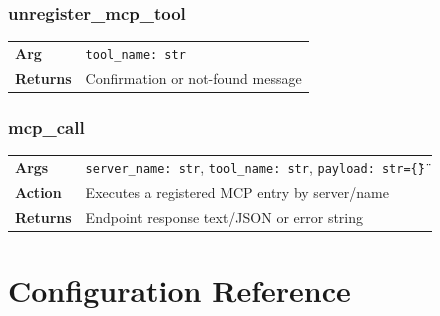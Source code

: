 \documentclass[11pt,a4paper]{article}
\begin{document}
\subsubsection{unregister\_mcp\_tool}

\begin{tabular}{@{}lp{10cm}@{}}
\textbf{Arg} & \texttt{tool\_name: str} \\
\textbf{Returns} & Confirmation or not-found message \\
\end{tabular}

\subsubsection{mcp\_call}

\begin{tabular}{@{}lp{10cm}@{}}
\textbf{Args} & \texttt{server\_name: str}, \texttt{tool\_name: str}, \texttt{payload: str=\"\{\}\"} \\
\textbf{Action} & Executes a registered MCP entry by server/name \\
\textbf{Returns} & Endpoint response text/JSON or error string \\
\end{tabular}

\section{Configuration Reference}
\end{document}
